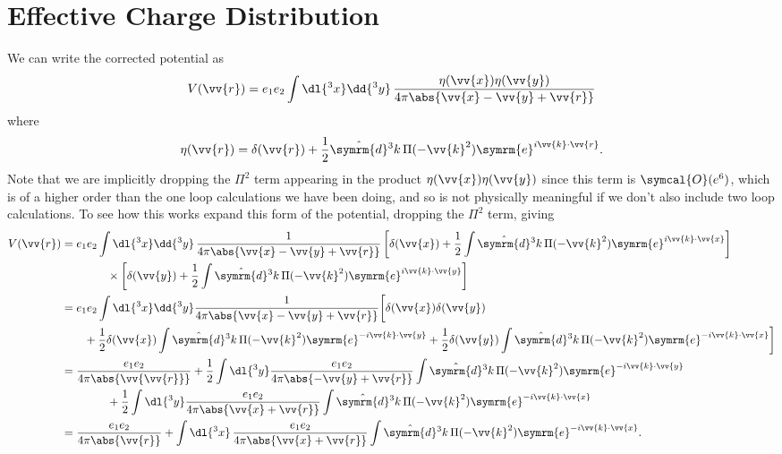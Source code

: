 \documentclass[fleqn]{NotesClass}
\newcommand{\e}{\symrm{e}}
\newcommand{\dhat}[1]{\hat{\symrm{d}}{#1}}
\newcommand{\order}{\symcal{O}}
\begin{document}
    \section{Effective Charge Distribution}
    We can write the corrected potential as
    \begin{equation}
        V(\vv{r}) = e_1e_2 \int \dl{^3x} \dd{^3y} \, \frac{\eta(\vv{x})\eta(\vv{y})}{4\pi\abs{\vv{x} - \vv{y} + \vv{r}}}
    \end{equation}
    where
    \begin{equation}
        \eta(\vv{r}) = \delta(\vv{r}) + \frac{1}{2} \dhat{^3k} \, \Pi(-\vv{k}^2) \e^{i\vv{k} \cdot \vv{r}}.
    \end{equation}
    Note that we are implicitly dropping the \(\Pi^2\) term appearing in the product \(\eta(\vv{x})\eta(\vv{y})\) since this term is \(\order(e^6)\), which is of a higher order than the one loop calculations we have been doing, and so is not physically meaningful if we don't also include two loop calculations.
    To see how this works expand this form of the potential, dropping the \(\Pi^2\) term, giving
    \begin{align}
        V(\vv{r}) &= e_1e_2 \int \dl{^3x} \dd{^3y} \, \frac{1}{4\pi\abs{\vv{x} - \vv{y} + \vv{r}}} \left[ \delta(\vv{x}) + \frac{1}{2} \int \dhat{^3k} \, \Pi(-\vv{k}^2)\e^{i\vv{k} \cdot \vv{x}} \right] \notag\\
        &\qquad\qquad\times \left[ \delta(\vv{y}) + \frac{1}{2} \int \dhat{^3k} \, \Pi(-\vv{k}^2)\e^{i\vv{k} \cdot \vv{y}} \right]\\
        &= e_1e_2 \int \dl{^3x} \dd{^3y} \frac{1}{4\pi\abs{\vv{x} - \vv{y} + \vv{r}}} \bigg[ \delta(\vv{x})\delta(\vv{y})\\
        &\qquad + \frac{1}{2} \delta(\vv{x}) \int \dhat{^3k} \, \Pi(-\vv{k}^2)\e^{-i\vv{k}\cdot\vv{y}} + \frac{1}{2}\delta(\vv{y})\int\dhat{^3k} \, \Pi(-\vv{k}^2)\e^{-i\vv{k}\cdot\vv{x}} \bigg] \notag\\
        &= \frac{e_1e_2}{4\pi\abs{\vv{\vv{r}}}} + \frac{1}{2} \int \dl{^3y} \frac{e_1e_2}{4\pi\abs{-\vv{y} + \vv{r}}} \int \dhat{^3k} \, \Pi(-\vv{k}^2)\e^{-i\vv{k}\cdot\vv{y}}\notag\\
        &\qquad\qquad+ \frac{1}{2} \int \dl{^3y} \frac{e_1e_2}{4\pi\abs{\vv{x} + \vv{r}}} \int \dhat{^3k} \, \Pi(-\vv{k}^2)\e^{-i\vv{k}\cdot\vv{x}}\\
        &= \frac{e_1e_2}{4\pi\abs{\vv{r}}} + \int \dl{^3x} \, \frac{e_1e_2}{4\pi\abs{\vv{x} + \vv{r}}} \int \dhat{^3k} \, \Pi(-\vv{k}^2) \e^{-i\vv{k}\cdot\vv{x}}.
    \end{align}
\end{document}
